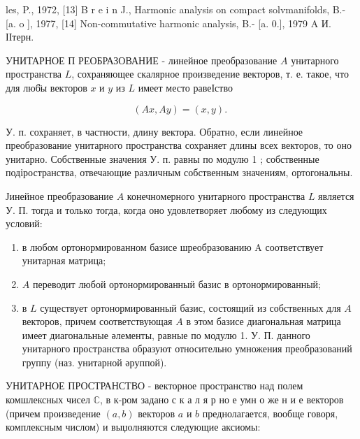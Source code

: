 \documentclass[10pt]{article}
\begin{document}
les, P., 1972, [13] B r e i n J., Harmonic analysis on compact solvmanifolds, B.- [a. o ], 1977, [14] Non-commutative harmonic analysis, B.- [a. 0.], 1979 A И. ІІтерн.



УНИТАРНОЕ П РЕОБРАЗОВАНИЕ - линейное преобразование $A$ унитарного пространства $L$, сохраняющее скалярное произведение векторов, т. е. такое, что для люб̈ы векторов $x$ и $y$ из $L$ имеет место равеІство



\[

(A x, A y)=(x, y) \text {. }

\]



У. п. сохраняет, в частности, длину вектора. Обратно, если линейное преобразование унитарного пространства сохраняет длины всех векторов, то оно унитарно. Собственные значения У. п. равны по модулю 1 ; собственные подіространства, отвечающие различным собственным значениям, ортогональны.



Јинейное преобразование $A$ конечномерного унитарного пространства $L$ является У. П. тогда и только тогда, когда оно удовлетворяет любому из следующих условий:



\begin{enumerate}

  \item в любом ортонормированном базисе шреобразованию A соответствует унитарная матрица;



  \item $A$ переводит любой ортонормированныӥ базис в ортонормированный;



  \item в $L$ существует ортонормированный базис, состоящий из собственных для $A$ векторов, причем соответствующая $A$ в этом базисе диагональная матрица имеет диагональные әлементы, равные по модулю 1. У. П. данного унитарного пространства образуют относительно умножения преобразований группу (наз. унитарной әруппой).



\end{enumerate}



УНИТАРНОЕ ПРОСТРАНСТВО - векторное пространство над полем комшлексных чисел $\mathbb{C}$, в к-ром задано с к а л я р но е умн о же н и е векторов (причем произведение $(a, b)$ векторов $a$ и $b$ преднолагается, вообще говоря, комплексным числом) и выџолняются следующие аксиомы:
\end{document}
